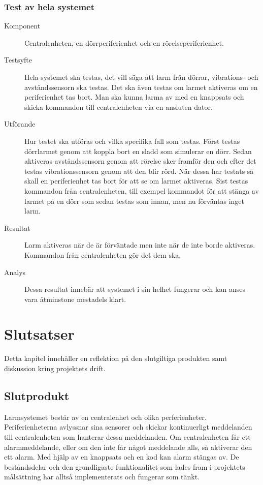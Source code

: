 \documentclass[a4paper]{article}
\begin{document}
\subsubsection{Test av hela systemet}
\begin{description}
\item[Komponent] Centralenheten, en dörrperiferienhet och en rörelseperiferienhet.

\item[Testsyfte] Hela systemet ska testas, det vill säga att larm från dörrar, vibrations- och avståndssensorn ska testas.
Det ska även testas om larmet aktiveras om en periferienhet tas bort.
Man ska kunna larma av med en knappsats och skicka kommandon till centralenheten via en ansluten dator.

\item[Utförande] Hur testet ska utföras och vilka specifika fall som testas.
Först testas dörrlarmet genom att koppla bort en sladd som simulerar en dörr.
Sedan aktiveras avståndssensorn genom att rörelse sker framför den och efter det testas vibrationssensorn genom att den blir rörd.
När dessa har testats så skall en periferienhet tas bort för att se om larmet aktiveras.
Sist testas kommandon från centralenheten, till exempel kommandot för att stänga av larmet på en dörr som sedan testas som innan, men nu förväntas inget larm.

\item[Resultat] Larm aktiveras när de är förväntade men inte när de inte borde aktiveras.
Kommandon från centralenheten gör det dem ska.

\item[Analys] Dessa resultat innebär att systemet i sin helhet fungerar och kan anses vara åtminstone mestadels klart.
\end{description}


\section{Slutsatser}
Detta kapitel innehåller en reflektion på den slutgiltiga produkten samt diskussion kring projektets drift.
\subsection{Slutprodukt}

Larmsystemet består av en centralenhet och olika perferienheter.
Periferienheterna avlyssnar sina sensorer och skickar kontinuerligt meddelanden till centralenheten som hanterar dessa meddelanden.
Om centralenheten får ett alarmmeddelande, eller om den inte får något meddelande alls, så aktiverar den ett alarm.
Med hjälp av en knappsats och en kod kan alarm stängas av.
De beståndsdelar och den grundligaste funktionalitet som lades fram i projektets målsättning har alltså implementerats och fungerar som tänkt.
\end{document}
